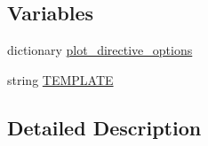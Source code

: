 \subsection*{Variables}
\begin{DoxyCompactItemize}
\item 
dictionary \hyperlink{namespacenumpydoc_1_1plot__directive_a6206bc6678f1dc01750dfab138d5c5a8}{plot\+\_\+directive\+\_\+options}
\item 
string \hyperlink{namespacenumpydoc_1_1plot__directive_a3c421da98ea0efafc9a723bd1e00870b}{T\+E\+M\+P\+L\+A\+T\+E}
\end{DoxyCompactItemize}


\subsection{Detailed Description}
